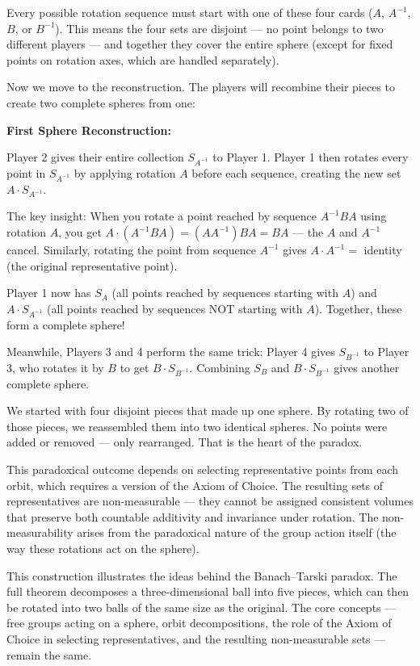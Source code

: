 Every possible rotation sequence must start with one of these four cards ($A$, $A^{-1}$, $B$, or $B^{-1}$). This means the four sets are disjoint — no point belongs to two different players — and together they cover the entire sphere (except for fixed points on rotation axes, which are handled separately).

Now we move to the reconstruction. The players will recombine their pieces to create two complete spheres from one:

\textbf{First Sphere Reconstruction:}

Player 2 gives their entire collection $S_{A^{-1}}$ to Player 1. Player 1 then rotates every point in $S_{A^{-1}}$ by applying rotation $A$ before each sequence, creating the new set $A \cdot S_{A^{-1}}$.

The key insight: When you rotate a point reached by sequence $A^{-1}BA$ using rotation $A$, you get $A \cdot (A^{-1}BA) = (AA^{-1})BA = BA$ — the $A$ and $A^{-1}$ cancel. Similarly, rotating the point from sequence $A^{-1}$ gives $A \cdot A^{-1} = $ identity (the original representative point).

Player 1 now has $S_A$ (all points reached by sequences starting with $A$) and $A \cdot S_{A^{-1}}$ (all points reached by sequences NOT starting with $A$). Together, these form a complete sphere!

Meanwhile, Players 3 and 4 perform the same trick: Player 4 gives $S_{B^{-1}}$ to Player 3, who rotates it by $B$ to get $B \cdot S_{B^{-1}}$. Combining $S_B$ and $B \cdot S_{B^{-1}}$ gives another complete sphere.

We started with four disjoint pieces that made up one sphere. By rotating two of those pieces, we reassembled them into two identical spheres. No points were added or removed — only rearranged. That is the heart of the paradox.

This paradoxical outcome depends on selecting representative points from each orbit, which requires a version of the Axiom of Choice. The resulting sets of representatives are non-measurable — they cannot be assigned consistent volumes that preserve both countable additivity and invariance under rotation. The non-measurability arises from the paradoxical nature of the group action itself (the way these rotations act on the sphere).

This construction illustrates the ideas behind the Banach–Tarski paradox. The full theorem decomposes a three-dimensional ball into five pieces, which can then be rotated into two balls of the same size as the original. The core concepts — free groups acting on a sphere, orbit decompositions, the role of the Axiom of Choice in selecting representatives, and the resulting non-measurable sets — remain the same.

